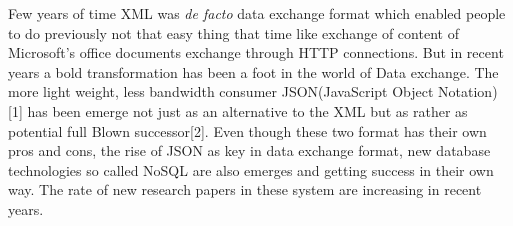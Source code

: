 	Few years of time XML was  \textit{de facto} data exchange format which enabled people to do previously not that easy thing that time like exchange of content of Microsoft's office documents exchange through HTTP connections. 
	But in recent years a bold transformation has been a foot in the world of Data exchange. The more light weight, less bandwidth consumer JSON(JavaScript Object Notation)[1] has been emerge not just as an alternative to the XML but as rather as potential full Blown successor[2]. Even though these two format has their own pros and cons, the rise of JSON as key in data exchange format, new database technologies so called NoSQL  are also emerges and getting success in their own way. The rate of new research papers in these system are increasing in recent years. 